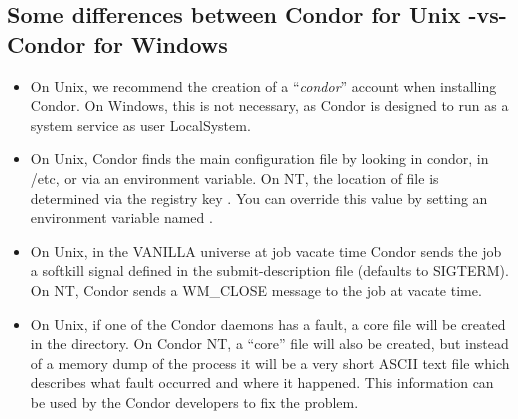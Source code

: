 \subsection{Some differences between Condor for Unix -vs- Condor for Windows}

\begin{itemize}

\item On Unix, we recommend the creation of a ``\textit{condor}'' account
when installing Condor.  On Windows, this is not necessary, as Condor is
designed to run as a system service as user LocalSystem.

\item On Unix, Condor finds the  main configuration
file by looking in \Tilde condor, in /etc, or via an environment variable.
On NT, the location of  file is determined
via the registry key .
You can override this value by setting an environment variable named
.

\item On Unix, in the VANILLA universe at job vacate time Condor sends the
job a softkill signal defined in the submit-description file (defaults to
SIGTERM).  On NT, Condor sends a WM\_CLOSE message to the job at vacate
time.

\item On Unix, if one of the Condor daemons has a fault, a core file
will be created in the  directory.  On Condor NT, a
``core'' file will also be created, but instead of a memory dump of the
process it will be a very short ASCII text file which describes what
fault occurred and where it happened.  This information can be used by
the Condor developers to fix the problem.

\end{itemize}


